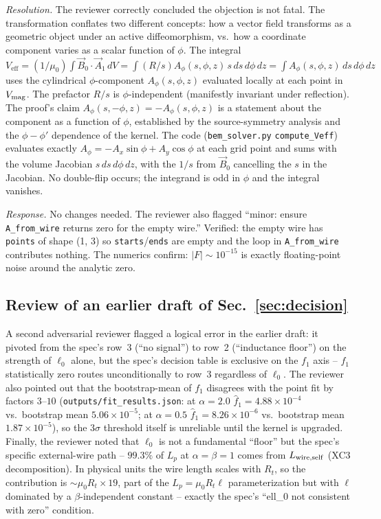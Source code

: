 \documentclass[11pt]{article}
\newcommand{\Veff}{V_{\mathrm{eff}}}
\begin{document}
\emph{Resolution.}  The reviewer correctly concluded the objection is
not fatal.  The transformation conflates two different concepts: how a
vector field transforms as a geometric object under an active
diffeomorphism, vs.\ how a coordinate component varies as a scalar
function of $\phi$.  The integral
$\Veff=(1/\mu_0)\int \vec B_0\cdot\vec A_1\,dV=
\int(R/s) A_\phi(s,\phi,z)\,s\,ds\,d\phi\,dz=\int A_\phi(s,\phi,z)\,
ds\,d\phi\,dz$ uses the cylindrical $\phi$-component
$A_\phi(s,\phi,z)$ evaluated locally at each point in $V_{\rm mag}$.
The prefactor $R/s$ is $\phi$-independent (manifestly invariant under
reflection).  The proof's claim
$A_\phi(s,-\phi,z)=-A_\phi(s,\phi,z)$ is a statement about the
component as a function of $\phi$, established by the source-symmetry
analysis and the $\phi-\phi'$ dependence of the kernel.  The code
(\texttt{bem\_solver.py} \texttt{compute\_Veff}) evaluates exactly
$A_\phi = -A_x\sin\phi+A_y\cos\phi$ at each grid point and sums with
the volume Jacobian $s\,ds\,d\phi\,dz$, with the $1/s$ from
$\vec B_0$ cancelling the $s$ in the Jacobian.  No double-flip occurs;
the integrand is odd in $\phi$ and the integral vanishes.

\emph{Response.}  No changes needed.  The reviewer also flagged
``minor: ensure \texttt{A\_from\_wire} returns zero for the empty
wire.''  Verified: the empty wire has \texttt{points} of shape (1, 3)
so \texttt{starts}/\texttt{ends} are empty and the loop in
\texttt{A\_from\_wire} contributes nothing.  The numerics confirm:
$|F|\sim 10^{-15}$ is exactly floating-point noise around the
analytic zero.

\subsection*{Review of an earlier draft of Sec.~\ref{sec:decision}}

A second adversarial reviewer flagged a logical error in the earlier
draft: it pivoted from the spec's row~3 (``no signal'') to row~2
(``inductance floor'') on the strength of $\ell_0$ alone, but the
spec's decision table is exclusive on the $f_1$ axis -- $f_1$
statistically zero routes unconditionally to row~3 regardless of
$\ell_0$.  The reviewer also pointed out that the bootstrap-mean of
$f_1$ disagrees with the point fit by factors $3$--$10$
(\texttt{outputs/fit\_results.json}: at $\alpha\!=\!2.0$
$\hat f_1=4.88\times 10^{-4}$ vs.\ bootstrap mean $5.06\times 10^{-5}$;
at $\alpha\!=\!0.5$ $\hat f_1=8.26\times 10^{-6}$ vs.\ bootstrap mean
$1.87\times 10^{-5}$), so the $3\sigma$ threshold itself is unreliable
until the kernel is upgraded.  Finally, the reviewer noted that
$\ell_0$ is not a fundamental ``floor'' but the spec's specific
external-wire path -- $99.3\%$ of $L_p$ at $\alpha=\beta=1$ comes from
$L_{\rm wire,self}$ (XC3 decomposition).  In physical units the wire
length scales with $R_t$, so the contribution is
$\sim\mu_0 R_t\times 19$, part of the $L_p=\mu_0 R_t \ell$
parameterization but with $\ell$ dominated by a $\beta$-independent
constant -- exactly the spec's ``ell\_0 not consistent with zero''
condition.
\end{document}
